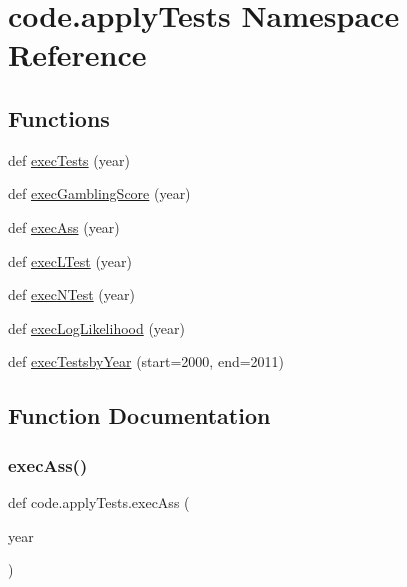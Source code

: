 \hypertarget{namespacecode_1_1apply_tests}{}\section{code.\+apply\+Tests Namespace Reference}
\label{namespacecode_1_1apply_tests}
\subsection*{Functions}
\begin{DoxyCompactItemize}
\item 
def \hyperlink{namespacecode_1_1apply_tests_a91f5be82efab33aaac0749d996b01619}{exec\+Tests} (year)
\item 
def \hyperlink{namespacecode_1_1apply_tests_a1c949f8a50fdd1e2c8d171a07329011c}{exec\+Gambling\+Score} (year)
\item 
def \hyperlink{namespacecode_1_1apply_tests_a206e799ac0da8a7f30990484b77e2703}{exec\+Ass} (year)
\item 
def \hyperlink{namespacecode_1_1apply_tests_aad827b9edb3d89c01c425b112267c8c2}{exec\+L\+Test} (year)
\item 
def \hyperlink{namespacecode_1_1apply_tests_a078400e5967e6416e481040be98662ef}{exec\+N\+Test} (year)
\item 
def \hyperlink{namespacecode_1_1apply_tests_a50007d1698c04b7f1f24ad1297bd275e}{exec\+Log\+Likelihood} (year)
\item 
def \hyperlink{namespacecode_1_1apply_tests_a0941d84a615ef97bf6ca19fa41a9c535}{exec\+Testsby\+Year} (start=2000, end=2011)
\end{DoxyCompactItemize}


\subsection{Function Documentation}
\mbox{\label{namespacecode_1_1apply_tests_a206e799ac0da8a7f30990484b77e2703}} 
\subsubsection{\texorpdfstring{exec\+Ass()}{execAss()}}
{\footnotesize\ttfamily def code.\+apply\+Tests.\+exec\+Ass (\begin{DoxyParamCaption}\item[{}]{year }\end{DoxyParamCaption})}




